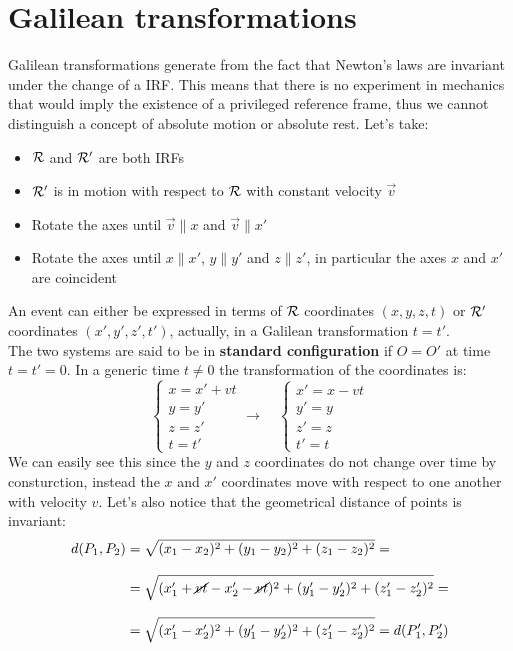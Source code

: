 \section{Galilean transformations}
Galilean transformations generate from the fact that Newton's laws are invariant under the change of a IRF. This means that there is no experiment in mechanics that would imply the existence of a privileged reference frame, thus we cannot distinguish a concept of absolute motion or absolute rest. Let's take:
\begin{itemize}
  \item $\mathcal{R}$ and $\mathcal{R'}$ are both IRFs
  \item $\mathcal{R'}$ is in motion with respect to $\mathcal{R}$ with constant velocity $\vec{v}$
  \item Rotate the axes until $\vec{v} \parallel x$ and $\vec{v} \parallel x'$
  \item Rotate the axes until $x \parallel x'$, $y \parallel y'$ and $z \parallel z'$, in particular the axes $x$ and $x'$ are coincident
\end{itemize}
An event can either be expressed in terms of $\mathcal{R}$ coordinates $(x,y,z,t)$ or $\mathcal{R'}$ coordinates $(x',y',z',t')$, actually, in a Galilean transformation $t=t'$.\\
The two systems are said to be in \textbf{standard configuration} if $O=O'$ at time $t=t'=0$. In a generic time $t\neq 0$ the transformation of the coordinates is:
\begin{equation}
  \begin{cases}
    x = x' + vt\\[8pt]
    y = y'\\[8pt]
    z = z'\\[8pt]
    t = t'
  \end{cases} \longrightarrow \quad
  \begin{cases}
    x' = x - vt\\[8pt]
    y' = y\\[8pt]
    z' = z\\[8pt]
    t' = t
  \end{cases}
\end{equation}
We can easily see this since the $y$ and $z$ coordinates do not change over time by consturction, instead the $x$ and $x'$ coordinates move with respect to one another with velocity $v$. Let's also notice that the geometrical distance of points is invariant:
\begin{equation}
  \begin{split}
    d(P_1,P_2) &= \sqrt{(x_1 - x_2)^2 + (y_1 - y_2)^2 + (z_1 - z_2)^2} =\\[8pt]
    &= \sqrt{(x'_1 + \cancel{vt} - x'_2 - \cancel{vt})^2 + (y'_1 - y'_2)^2 + (z'_1  - z'_2)^2} =\\[8pt]
    &= \sqrt{(x'_1 - x'_2)^2 + (y'_1 - y'_2)^2 + (z'_1  - z'_2)^2} = d(P'_1,P'_2)
  \end{split}
\end{equation}
